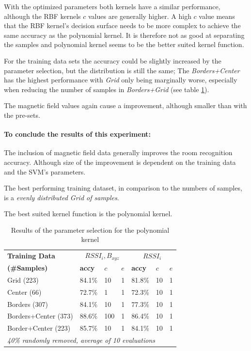 With the optimized parameters both kernels have a similar performance, although the RBF kernels $c$ values are generally higher. A high $c$ value means that the RBF kernel's decision surface needs to be more complex to achieve the same accuracy as the polynomial kernel. It is therefore not as good at separating the samples and polynomial kernel seems to be the better suited kernel function. 

For the training data sets the accuracy could be slightly increased by the parameter selection, but the distribution is still the same; The \emph{Borders+Center} has the highest performance with \emph{Grid} only being marginally worse, especially when reducing the number of samples in \emph{Borders+Grid} (see table \ref{tab:SVMconfigurationPoly}).

The magnetic field values again cause a improvement, although smaller than with the pre-sets.

\paragraph{To conclude the results of this experiment:} The inclusion of magnetic field data generally improves the room recognition accuracy. Although size of the improvement is dependent on the training data and the SVM's parameters.

The best performing training dataset, in comparison to the numbers of samples, is a \emph{evenly distributed Grid of samples}. 

The best suited kernel function is the polynomial kernel.



\begin{table}
\centering
\begin{tabular}{l l l l l l l}
\toprule
\textbf{Training Data}&\multicolumn{3}{c}{\boldmath$RSSI_{i},B_{xyz}$}&\multicolumn{3}{c}{\boldmath$RSSI_{i}$}\\
\textbf{(\#Samples)}&\textbf{accy}&$c$&$e$&\textbf{accy}&$c$&$e$\\
\midrule
Grid (223)&84.1\%&10&1&81.8\%&10&1\\
Center (66)&72.7\%&1&1&72.3\%&10&1\\
Borders (307)&84.1\%&10&1&77.3\%&10&1\\
Borders+Center (373)&88.6\%&100&1&86.4\%&10&1\\
Border+Center (223)&85.7\%&10&1&84.1\%&10&1\\
\multicolumn{7}{l}{\textit{40\% randomly removed, average of 10 evaluations}}\\
\bottomrule
\end{tabular}
\caption[Room Recognition - polynomial kernel parameter selection]{Results of the parameter selection for the polynomial kernel}
\label{tab:SVMconfigurationPoly}
\end{table}

